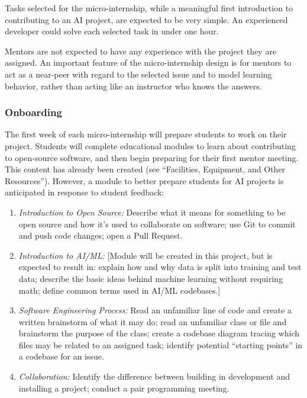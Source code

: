 Tasks selected for the micro-internship, while a meaningful first introduction to contributing to an AI project, are expected to be very simple. An experienced developer could solve each selected task in under one hour.

Mentors are not expected to have any experience with the project they are assigned. An important feature of the micro-internship design is for mentors to act as a near-peer with regard to the selected issue and to model learning behavior, rather than acting like an instructor who knows the answers.

\subsubsection{Onboarding}

The first week of each micro-internship will prepare students to work on their project. Students will complete educational modules to learn about contributing to open-source software, and then begin preparing for their first mentor meeting. This content has already been created (see ``Facilities, Equipment, and Other Resources''). However, a module to better prepare students for AI projects is anticipated in response to student feedback:

\begin{enumerate}
    \item \textit{Introduction to Open Source:} Describe what it means for something to be open source and how it's used to collaborate on software; use Git to commit and push code changes; open a Pull Request.
    \item \textit{Introduction to AI/ML:} [Module will be created in this project, but is expected to result in: explain how and why data is split into training and test data; describe the basic ideas behind machine learning without requiring math; define common terms used in AI/ML codebases.]
    \item \textit{Software Engineering Process:} Read an unfamiliar line of code and create a written brainstorm of what it may do; read an unfamiliar class or file and brainstorm the purpose of the class; create a codebase diagram tracing which files may be related to an assigned task; identify potential ``starting points'' in a codebase for an issue.
    \item \textit{Collaboration:} Identify the difference between building in development and installing a project; conduct a pair programming meeting.
\end{enumerate}

